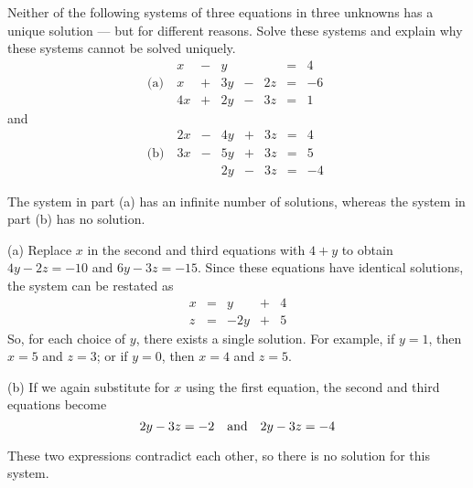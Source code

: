 \documentclass{ximera}
\begin{document}
\begin{exercise} \label{c2.1.9}
Neither of the following systems of three equations in three
unknowns has a unique solution --- but for different
reasons.  Solve these systems and explain why these systems
cannot be solved uniquely.
\[
\mbox{(a) }\; \begin{array}{rcrcrcr}
  x & - &  y &   &    & = &  4\\
  x & + & 3y & - & 2z & = & -6\\
 4x & + & 2y & - & 3z & = &  1
              \end{array}
            \]
            and
            \[\mbox{(b) }\; \begin{array}{rcrcrcr}
 2x & - & 4y & + & 3z & = &  4\\
 3x & - & 5y & + & 3z & = &  5\\
    &   & 2y & - & 3z & = & -4
\end{array}
\]

\begin{solution}

\ans The system in part (a) has an infinite number of solutions, whereas
the system in part (b) has no solution.

\soln (a) Replace $x$ in the second and third equations with
$4 + y$ to obtain $4y - 2z = -10$ and $6y - 3z = -15$.  Since these
equations have identical solutions, the system can be restated as
\[
\begin{array}{rrrrrrr}
x & = & y & + & 4 \\ 
z & = & -2y & + & 5\end{array}
\]
So, for each choice of $y$, there exists a single solution.  For
example, if $y = 1$, then $x = 5$ and $z = 3$; or if $y = 0$, then
$x = 4$ and $z = 5$.

(b) If we again substitute for $x$ using the first equation, the
second and third equations become
\[
2y - 3z = -2 \quad\mbox{and}\quad 2y - 3z = -4
\]

These two expressions contradict each other, so there is no solution
for this system.


\end{solution}
\end{exercise}
\end{document}
